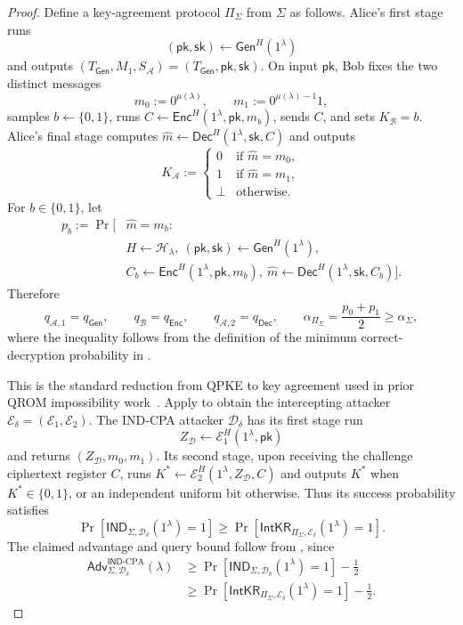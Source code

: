 \documentclass[11pt]{article}
\newcommand{\bits}{\{0,1\}}
\newcommand{\cA}{\mathcal{A}}
\newcommand{\cB}{\mathcal{B}}
\newcommand{\cD}{\mathcal{D}}
\newcommand{\cE}{\mathcal{E}}
\newcommand{\cH}{\mathcal{H}}
\newcommand{\IntKR}{\mathsf{IntKR}}
\newcommand{\Adv}{\mathsf{Adv}}
\newcommand{\Gen}{\mathsf{Gen}}
\newcommand{\Enc}{\mathsf{Enc}}
\newcommand{\Dec}{\mathsf{Dec}}
\newcommand{\IND}{\mathsf{IND}}
\newcommand{\pk}{\mathsf{pk}}
\newcommand{\sk}{\mathsf{sk}}
\begin{document}
\begin{proof}
Define a key-agreement protocol \(\Pi_\Sigma\) from \(\Sigma\) as follows.
Alice's first stage runs
\[
  (\pk,\sk)\leftarrow\Gen^H(1^\lambda)
\]
and outputs \((T_{\Gen},M_1,S_{\cA})=(T_{\Gen},\pk,\sk)\).  On input
\(\pk\), Bob fixes the two distinct messages
\[
  m_0:=0^{\mu(\lambda)},
  \qquad
  m_1:=0^{\mu(\lambda)-1}1,
\]
samples \(b\leftarrow\bits\), runs
\(C\leftarrow\Enc^H(1^\lambda,\pk,m_b)\), sends \(C\), and sets
\(K_{\cB}=b\). Alice's final stage computes
\(\widehat m\leftarrow\Dec^H(1^\lambda,\sk,C)\) and outputs
\[
  K_{\cA}:=
  \begin{cases}
    0 & \text{if }\widehat m=m_0,\\
    1 & \text{if }\widehat m=m_1,\\
    \bot & \text{otherwise.}
  \end{cases}
\]
For \(b\in\bits\), let
\begin{align*}
  p_b:=\Pr\bigl[&\widehat m=m_b:\ \\
    &H\leftarrow\cH_\lambda,\
    (\pk,\sk)\leftarrow\Gen^H(1^\lambda),\\
    &C_b\leftarrow\Enc^H(1^\lambda,\pk,m_b),\
    \widehat m\leftarrow\Dec^H(1^\lambda,\sk,C_b)\bigr].
\end{align*}
Therefore
\[
  q_{\cA,1}=q_{\Gen},\qquad
  q_{\cB}=q_{\Enc},\qquad
  q_{\cA,2}=q_{\Dec},
  \qquad
  \alpha_{\Pi_\Sigma}=\frac{p_0+p_1}{2}\ge\alpha_\Sigma,
\]
where the inequality follows from the definition of the minimum
correct-decryption probability in .

This is the standard reduction from QPKE to key agreement used in prior
QROM impossibility work~\cite{BouazizEtAl24,LiEtAl24}. Apply
\Cref{thm:main} to obtain the
intercepting attacker
\(\cE_\delta=(\cE_{1},\cE_{2})\).  The IND-CPA
attacker \(\cD_\delta\) has its first stage run
\[
  Z_{\cD}\leftarrow\cE_{1}^H(1^\lambda,\pk)
\]
and returns \((Z_{\cD},m_0,m_1)\). Its second stage, upon
receiving the challenge ciphertext register \(C\), runs
\(K^*\leftarrow\cE_{2}^H(1^\lambda,Z_{\cD},C)\) and outputs \(K^*\)
when \(K^*\in\bits\), or an independent uniform bit otherwise.  Thus its
success probability satisfies
\[
  \Pr[\IND_{\Sigma,\cD_\delta}(1^\lambda)=1]
  \ge
  \Pr[\IntKR_{\Pi_\Sigma,\cE_\delta}(1^\lambda)=1].
\]
The claimed advantage and query bound follow from , since
\begin{align*}
  \Adv^{\IND\text{-}\mathrm{CPA}}_{\Sigma,\cD_\delta}(\lambda)
  &\ge
  \Pr[\IND_{\Sigma,\cD_\delta}(1^\lambda)=1]-\frac12\\
  &\ge
  \Pr[\IntKR_{\Pi_\Sigma,\cE_\delta}(1^\lambda)=1]-\frac12.
\end{align*}


\end{proof}
\end{document}
